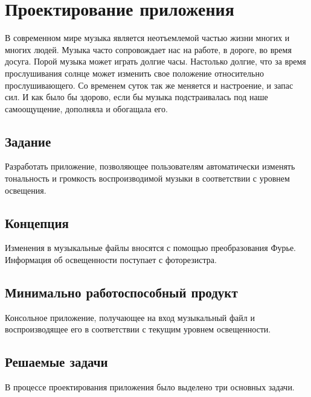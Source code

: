 \documentclass[a4paper]{article}
\begin{document}
\vfill %








\tableofcontents
\newpage



\section{Проектирование приложения}

В современном мире музыка является неотъемлемой частью жизни многих и многих людей. Музыка часто сопровождает нас на работе, в дороге, во время досуга. Порой музыка может играть долгие часы. Настолько долгие, что за время прослушивания солнце может изменить свое положение относительно прослушивающего. Со временем суток так же меняется и настроение, и запас сил. И как было бы здорово, если бы музыка подстраивалась под наше самоощущение, дополняла и обогащала его.

\subsection{Задание}

Разработать приложение, позволяющее пользователям автоматически изменять тональность и громкость воспроизводимой музыки в соответствии с уровнем освещения.

\subsection{Концепция}

Изменения в музыкальные файлы вносятся с помощью преобразования Фурье. Информация об освещенности поступает с фоторезистра.

\subsection{Минимально работоспособный продукт}

Консольное приложение, получающее на вход музыкальный файл и воспроизводящее его в соответствии с текущим уровнем освещенности.

\subsection{Решаемые задачи}

В процессе проектирования приложения было выделено три основных задачи.
\end{document}
